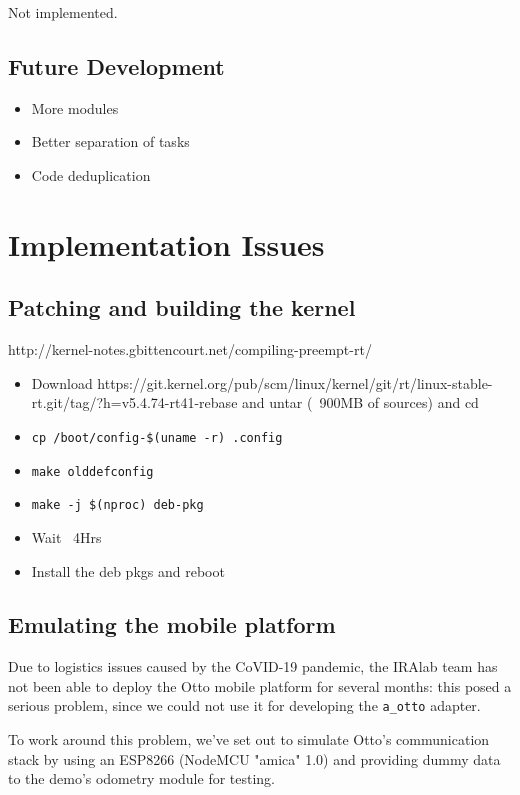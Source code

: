 \documentclass[a4paper,12pt]{report}
\begin{document}
Not implemented.

\section{Future Development}

\begin{itemize}
    \item More modules
    \item Better separation of tasks
    \item Code deduplication
\end{itemize}

\newpage
\chapter{Implementation Issues}
\section{Patching and building the kernel}

http://kernel-notes.gbittencourt.net/compiling-preempt-rt/

\begin{itemize}
    \item Download https://git.kernel.org/pub/scm/linux/kernel/git/rt/linux-stable-rt.git/tag/?h=v5.4.74-rt41-rebase and untar (~900MB of sources) and cd
    \item \texttt{cp /boot/config-\$(uname -r) .config}
    \item \texttt{make olddefconfig}
    \item \texttt{make -j \$(nproc) deb-pkg}
    \item Wait ~4Hrs
    \item Install the deb pkgs and reboot
\end{itemize}

\section{Emulating the mobile platform}

Due to logistics issues caused by the CoVID-19 pandemic, the IRAlab team has not been able to deploy the Otto mobile platform for several months: this posed a serious problem, since we could not use it for developing the \texttt{a\_otto} adapter.

To work around this problem, we've set out to simulate Otto's communication stack by using an ESP8266 (NodeMCU "amica" 1.0) and providing dummy data to the demo's odometry module for testing. 
\end{document}
